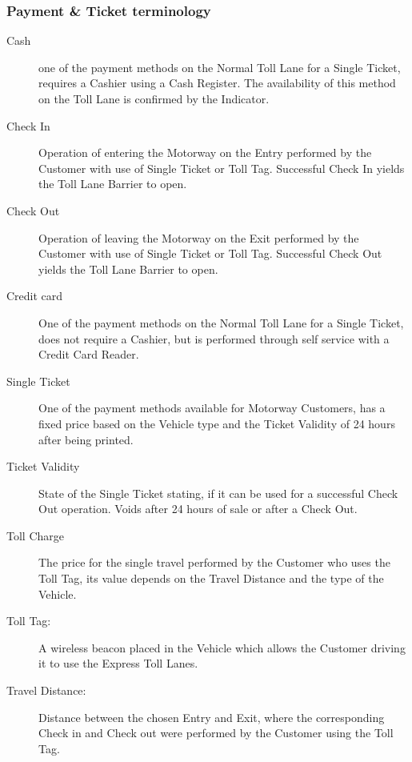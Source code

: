 \subsubsection{Payment \& Ticket terminology}
\begin{description}
  \item[Cash] one of the payment methods on the Normal Toll Lane for a Single Ticket, requires a Cashier using a Cash Register. The availability of this method on the Toll Lane is confirmed by the Indicator.
  \item[Check In] Operation of entering the Motorway on the Entry performed by the Customer with use of Single Ticket or Toll Tag. Successful Check In yields the Toll Lane Barrier to open.
  \item[Check Out] Operation of leaving the Motorway on the Exit performed by the Customer with use of Single Ticket or Toll Tag. Successful Check Out yields the Toll Lane Barrier to open.
  \item[Credit card] One of the payment methods on the Normal Toll Lane for a Single Ticket, does not require a Cashier, but is performed through self service with a Credit Card Reader.
  \item[Single Ticket] One of the payment methods available for Motorway Customers, has a fixed price based on the Vehicle type and the Ticket Validity of 24 hours after being printed.
  \item[Ticket Validity] State of the Single Ticket stating, if it can be used for a successful Check Out operation. Voids after 24 hours of sale or after a Check Out.
  \item[Toll Charge] The price for the single travel performed by the Customer who uses the Toll Tag, its value depends on the Travel Distance and the type of the Vehicle.
  \item[Toll Tag:] A wireless beacon placed in the Vehicle which allows the Customer driving it to use the Express Toll Lanes.
  \item[Travel Distance:] Distance between the chosen Entry and Exit, where the corresponding Check in and Check out were performed by the Customer using the Toll Tag.
\end{description}

